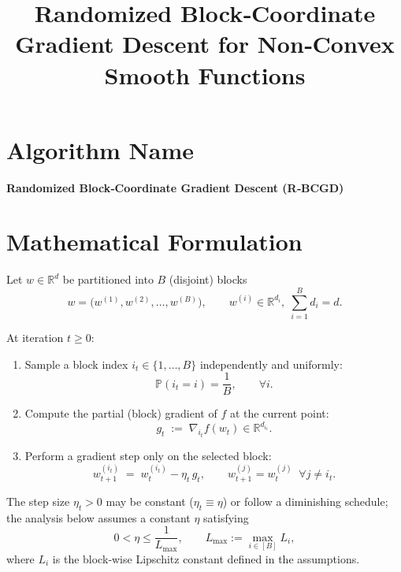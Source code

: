 \documentclass{article}
\title{Randomized Block‑Coordinate Gradient Descent for Non‑Convex Smooth Functions}
\author{}
\date{}
\begin{document}
\maketitle

\tableofcontents

\newpage

\section*{Algorithm Name}
\textbf{Randomized Block‑Coordinate Gradient Descent (R‑BCGD)}

\section*{Mathematical Formulation}
Let $w\in\mathbb{R}^d$ be partitioned into $B$ (disjoint) blocks
\[
w =\big( w^{(1)},w^{(2)},\dots ,w^{(B)}\big),\qquad 
w^{(i)}\in\mathbb{R}^{d_i},\; \sum_{i=1}^{B}d_i=d .
\]

At iteration $t\ge 0$:
\begin{enumerate}[label=\arabic*)]
\item Sample a block index $i_t\in\{1,\dots ,B\}$ independently and uniformly:
\[
\mathbb{P}(i_t=i)=\frac1B,\qquad \forall i.
\]
\item Compute the partial (block) gradient of $f$ at the current point:
\[
g_t \;:=\; \nabla_{i_t}f(w_t)\in\mathbb{R}^{d_{i_t}} .
\]
\item Perform a gradient step only on the selected block:
\[
w_{t+1}^{(i_t)} \;=\; w_t^{(i_t)}- \eta_t\, g_t ,\qquad 
w_{t+1}^{(j)} = w_t^{(j)}\;\; \forall j\neq i_t .
\]
\end{enumerate}
The step size $\eta_t>0$ may be constant ($\eta_t\equiv\eta$) or follow a diminishing schedule; the analysis below assumes a constant $\eta$ satisfying
\[
0<\eta\le \frac{1}{L_{\max}},\qquad 
L_{\max}:=\max_{i\in[B]}L_i,
\]
where $L_i$ is the block‑wise Lipschitz constant defined in the assumptions.

\end{document}
